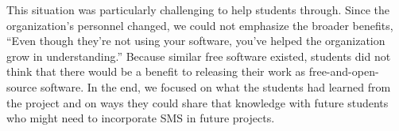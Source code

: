 This situation was particularly challenging to help students through.
Since the organization's personnel changed, we could not emphasize
the broader benefits, ``Even though they're not using your software,
you've helped the organization grow in understanding.'' Because
similar free software existed, students did not think that there
would be a benefit to releasing their work as free-and-open-source
software.  In the end, we focused on what the students had learned
from the project and on ways they could share that knowledge with
future students who might need to incorporate SMS in future projects.

